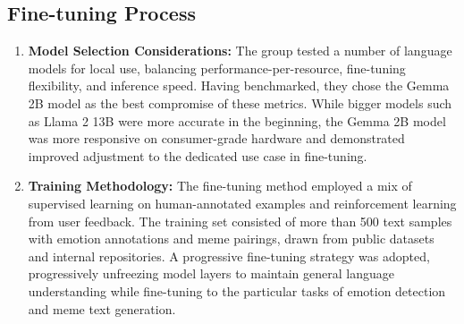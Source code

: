 \documentclass[conference]{IEEEtran}
\begin{document}
\subsection{Fine-tuning Process}
\begin{enumerate}
    \item \textbf{Model Selection Considerations:} The group tested a number of language models for local use, balancing performance-per-resource, fine-tuning flexibility, and inference speed. Having benchmarked, they chose the Gemma 2B model as the best compromise of these metrics. While bigger models such as Llama 2 13B were more accurate in the beginning, the Gemma 2B model was more responsive on consumer-grade hardware and demonstrated improved adjustment to the dedicated use case in fine-tuning.
    \item \textbf{Training Methodology:} The fine-tuning method employed a mix of supervised learning on human-annotated examples and reinforcement learning from user feedback. The training set consisted of more than 500 text samples with emotion annotations and meme pairings, drawn from public datasets and internal repositories. A progressive fine-tuning strategy was adopted, progressively unfreezing model layers to maintain general language understanding while fine-tuning to the particular tasks of emotion detection and meme text generation.
\end{enumerate}
\end{document}
